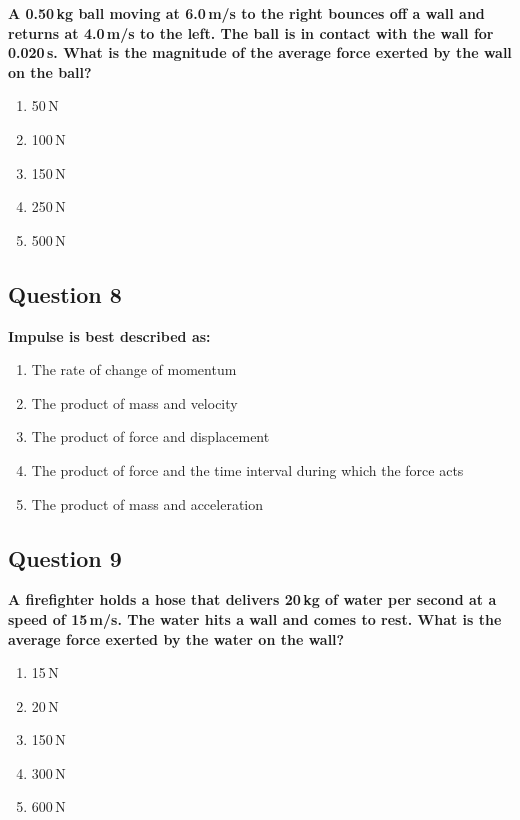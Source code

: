 \documentclass[12pt,letterpaper]{article}
\begin{document}
\begin{questionbox}
\textbf{A 0.50\,kg ball moving at 6.0\,m/s to the right bounces off a wall and returns at 4.0\,m/s to the left. The ball is in contact with the wall for 0.020\,s. What is the magnitude of the average force exerted by the wall on the ball?}

\begin{enumerate}[label=\alph*)]
    \item 50\,N
    \item 100\,N
    \item 150\,N
    \item 250\,N
    \item 500\,N
\end{enumerate}
\end{questionbox}

\subsection{Question 8}

\begin{questionbox}
\textbf{Impulse is best described as:}

\begin{enumerate}[label=\alph*)]
    \item The rate of change of momentum
    \item The product of mass and velocity
    \item The product of force and displacement
    \item The product of force and the time interval during which the force acts
    \item The product of mass and acceleration
\end{enumerate}
\end{questionbox}

\subsection{Question 9}

\begin{questionbox}
\textbf{A firefighter holds a hose that delivers 20\,kg of water per second at a speed of 15\,m/s. The water hits a wall and comes to rest. What is the average force exerted by the water on the wall?}

\begin{enumerate}[label=\alph*)]
    \item 15\,N
    \item 20\,N
    \item 150\,N
    \item 300\,N
    \item 600\,N
\end{enumerate}
\end{questionbox}
\end{document}
